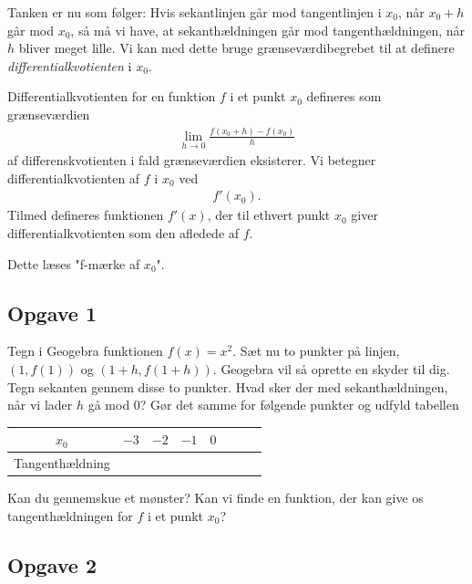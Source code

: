 Tanken er nu som følger: Hvis sekantlinjen går mod tangentlinjen i $x_0$, når $x_0 + h$ går mod $x_0$, så må vi have, at sekanthældningen går mod tangenthældningen, når $h$ bliver meget lille. Vi kan med dette bruge grænseværdibegrebet til at definere \textit{differentialkvotienten} i $x_0$. 
\begin{defn}[Differentialkvotienten]
	Differentialkvotienten for en funktion $f$ i et punkt $x_0$ defineres som grænseværdien
	\begin{align*}
		\lim_{h \to 0} \frac{f(x_0 + h)-f(x_0)}{h}
	\end{align*}
	af differenskvotienten i fald grænseværdien eksisterer. Vi betegner differentialkvotienten af $f$ i $x_0$ 
	ved
	\begin{align*}
		f'(x_0).
	\end{align*}
	Tilmed defineres funktionen $f'(x)$, der til ethvert punkt $x_0$ giver differentialkvotienten som den
	afledede af $f$. 
\end{defn}
Dette læses "f-mærke af $x_0$".

\newpage

\subsection*{Opgave 1}

Tegn i Geogebra funktionen $f(x) = x^2$. Sæt nu to punkter på linjen, $(1,f(1))$ og $(1+h,f(1+h))$. Geogebra vil så oprette en skyder til dig. Tegn sekanten gennem disse to punkter. Hvad sker der med sekanthældningen, når vi lader $h$ gå mod $0$? Gør det samme for følgende punkter og udfyld tabellen

\begin{center}
	\begin{tabular}{c|p{0.5cm}| >{\centering\arraybackslash} p{0.5cm}|>{\centering\arraybackslash} p{0.5cm}
	| >{\centering\arraybackslash} p{0.5cm}| >{\centering\arraybackslash} p{0.5cm}
	| >{\centering\arraybackslash} p{0.5cm}|>{\centering\arraybackslash} p{0.5cm}}
		$x_0$ & $-3$ & $-2$ & $-1$ & $0$ & 1 & 2 & 3 \\
		\hline
		Tangenthældning & & & & & & &
	\end{tabular}
\end{center}

Kan du gennemskue et mønster? Kan vi finde en funktion, der kan give os tangenthældningen for $f$ i et punkt
$x_0$?

\subsection*{Opgave 2}

